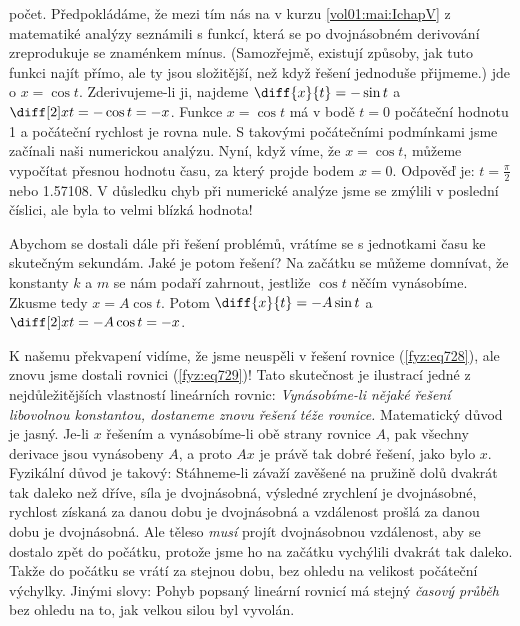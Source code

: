     počet. Předpokládáme, že mezi tím nás na v kurzu \ref{vol01:mai:IchapV} z matematiké analýzy
    seznámili s funkcí, která se po dvojnásobném derivování zreprodukuje se znaménkem mínus.
    (Samozřejmě, existují způsoby, jak tuto funkci najít přímo, ale ty jsou složitější, než když
    řešení jednoduše přijmeme.) jde o \(x=\cos t\). Zderivujeme-li ji, najdeme \(\diff{x}{t} = -\sin
    t\) a \(\diff[2]xt=-\cos t=-x\). Funkce \(x=\cos t\) má v bodě \(t= 0\) počáteční hodnotu
    \num{1} a počáteční rychlost je rovna nule. S takovými počátečními podmínkami jsme začínali naši
    numerickou analýzu. Nyní, když víme, že \(x=\cos t\), můžeme vypočítat přesnou hodnotu času, za
    který projde bodem \(x=0\). Odpověď je: \(t=\frac{\pi}{2}\) nebo \num{1.57108}. V důsledku chyb
    při numerické analýze jsme se zmýlili v poslední číslici, ale byla to velmi blízká hodnota!

    Abychom se dostali dále při řešení problémů, vrátíme se s jednotkami času ke skutečným sekundám.
    Jaké je potom řešení? Na začátku se můžeme domnívat, že konstanty \(k\) a \(m\) se nám podaří
    zahrnout, jestliže \(\cos t\) něčím vynásobíme. Zkusme tedy \(x=A\cos t\). Potom \(\diff{x}{t}=
    -A\sin t\) a \(\diff[2]xt = -A\cos t= - x\).

    K našemu překvapení vidíme, že jsme neuspěli v řešení rovnice (\ref{fyz:eq728}), ale znovu jsme
    dostali rovnici (\ref{fyz:eq729})! Tato skutečnost je ilustrací jedné z nejdůležitějších
    vlastností lineárních rovnic: \emph{Vynásobíme-li nějaké řešení libovolnou konstantou, dostaneme
    znovu řešení téže rovnice.} Matematický důvod je jasný. Je-li \(x\) řešením a vynásobíme-li obě
    strany rovnice \(A\), pak všechny derivace jsou vynásobeny \(A\), a proto \(Ax\) je právě tak
    dobré řešení, jako bylo \(x\). Fyzikální důvod je takový: Stáhneme-li závaží zavěšené na pružině
    dolů dvakrát tak daleko než dříve, síla je dvojnásobná, výsledné zrychlení je dvojnásobné,
    rychlost získaná za danou dobu je dvojnásobná a vzdálenost prošlá za danou dobu je dvojnásobná.
    Ale těleso \emph{musí} projít dvojnásobnou vzdálenost, aby se dostalo zpět do počátku, protože
    jsme ho na začátku vychýlili dvakrát tak daleko. Takže do počátku se vrátí za stejnou dobu, bez
    ohledu na velikost počáteční výchylky. Jinými slovy: Pohyb popsaný lineární rovnicí má stejný
    \emph{časový průběh} bez ohledu na to, jak velkou silou byl vyvolán.

